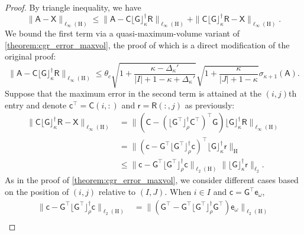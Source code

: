\documentclass[onefignum,onetabnum]{siamart250211}
\renewenvironment{equation*}{\[}{\]\ignorespacesafterend}
\newcommand{\Hilb}{\mathrm{H}}
\newcommand{\Batrix}[1]{\bm{\Matrix{#1}}}
\newcommand{\Matrix}[1]{\mathsf{#1}}
\newcommand{\trans}{\intercal}
\newcommand{\pinv}{\dagger}
\newcommand{\truncate}[3][]{#1\lfloor #2 #1\rfloor_{#3}}
\newcommand{\Index}[1]{{#1}}
\newcommand{\Norm}[3][]{#1\| #2 #1\|_{\mathrm{#3}}}
\begin{document}
\begin{proof}
By triangle inequality, we have
\begin{equation*}
    \Norm{\Batrix{A} - \Batrix{X}}{\ell_{\infty}(\Hilb)} \leq \Norm{\Batrix{A} - \Batrix{C} \truncate{\Batrix{G}}{\kappa}^\pinv \Batrix{R}}{\ell_{\infty}(\Hilb)} + \Norm{\Batrix{C} \truncate{\Batrix{G}}{\kappa}^\pinv \Batrix{R} - \Batrix{X}}{\ell_{\infty}(\Hilb)}.
\end{equation*}
We bound the first term via a quasi-maximum-volume variant of \cref{theorem:cgr_error_maxvol}, the proof of which is a direct modification of the original proof:
\begin{equation*}
    \Norm{\Batrix{A} - \Batrix{C} \truncate{\Batrix{G}}{\kappa}^\pinv \Batrix{R}}{\ell_{\infty}(\Hilb)} \leq \theta_c \sqrt{1 + \frac{\kappa - \Delta_\kappa'}{|\Index{I}| + 1 - \kappa + \Delta_\kappa'}} \sqrt{1 + \frac{\kappa}{|\Index{J}| + 1 - \kappa}} \sigma_{\kappa + 1}(\Batrix{A}).
\end{equation*}
Suppose that the maximum error in the second term is attained at the $(i,j)$th entry and denote $\Batrix{c}^\trans = \Batrix{C}(i,:)$ and $\Batrix{r} = \Batrix{R}(:, j)$ as previously:
\begin{align*}
    \Norm{\Batrix{C} \truncate{\Batrix{G}}{\kappa}^\pinv \Batrix{R} - \Batrix{X}}{\ell_{\infty}(\Hilb)} &= \Norm{(\Batrix{C} - (\truncate{\Batrix{G}^\trans}{\rho}^\pinv \Batrix{C}^\trans)^\trans \Batrix{G}) \truncate{\Batrix{G}}{\kappa}^\pinv \Batrix{R}}{\ell_{\infty}(\Hilb)} \\
    &= \Norm{(\Batrix{c} - \Batrix{G}^\trans \truncate{\Batrix{G}^\trans}{\rho}^\pinv \Batrix{c})^\trans \truncate{\Batrix{G}}{\kappa}^\pinv \Batrix{r}}{\Hilb} \\
    &\leq \Norm{\Batrix{c} - \Batrix{G}^\trans \truncate{\Batrix{G}^\trans}{\rho}^\pinv \Batrix{c}}{\ell_2(\Hilb)} \Norm{\truncate{\Batrix{G}}{\kappa}^\pinv \Batrix{r}}{\ell_2}.
\end{align*}
As in the proof of \cref{theorem:cgr_error_maxvol}, we consider different cases based on the position of $(i,j)$ relative to $(\Index{I}, \Index{J})$.
When $i \in \Index{I}$ and $\Batrix{c} = \Batrix{G}^\trans \Matrix{e}_{\omega}$,
\begin{align*}
    \Norm{\Batrix{c} - \Batrix{G}^\trans \truncate{\Batrix{G}^\trans}{\rho}^\pinv \Batrix{c}}{\ell_2(\Hilb)} &= \Norm{(\Batrix{G}^\trans - \Batrix{G}^\trans \truncate{\Batrix{G}^\trans}{\rho}^\pinv \Batrix{G}^\trans) \Matrix{e}_{\omega}}{\ell_2(\Hilb)} \\

\end{align*}
\end{proof}
\end{document}
